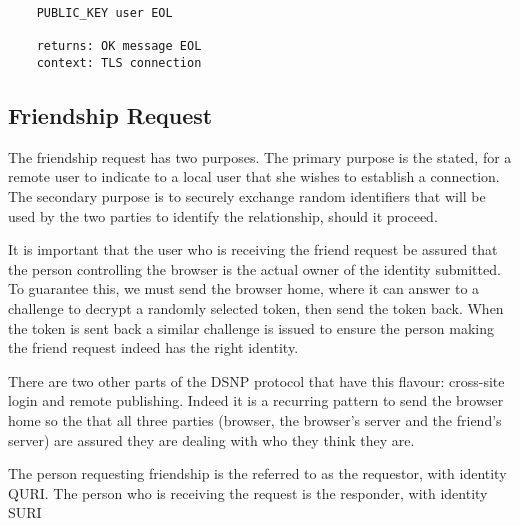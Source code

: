 \documentclass[letterpaper,11pt,oneside]{article}
\begin{document}
\vspace{10pt}
\begin{verbatim}
    PUBLIC_KEY user EOL

    returns: OK message EOL
    context: TLS connection
\end{verbatim}


\subsection{Friendship Request}

The friendship request has two purposes. The primary purpose is the stated, for
a remote user to indicate to a local user that she wishes to establish a
connection. The secondary purpose is to securely exchange random identifiers
that will be used by the two parties to identify the relationship, should it
proceed.

It is important that the user who is receiving the friend request be assured
that the person controlling the browser is the actual owner of the identity
submitted. To guarantee this, we must send the browser home, where it can
answer to a challenge to decrypt a randomly selected token, then send the token
back. When the token is sent back a similar challenge is issued to ensure the
person making the friend request indeed has the right identity.

There are two other parts of the DSNP protocol that have this flavour:
cross-site login and remote publishing. Indeed it is a recurring pattern to
send the browser home so the that all three parties (browser, the browser's
server and the friend's server) are assured they are dealing with who they
think they are.

The person requesting friendship is the referred to as the requestor, with
identity QURI. The person who is receiving the request is the responder, with
identity SURI
\end{document}

